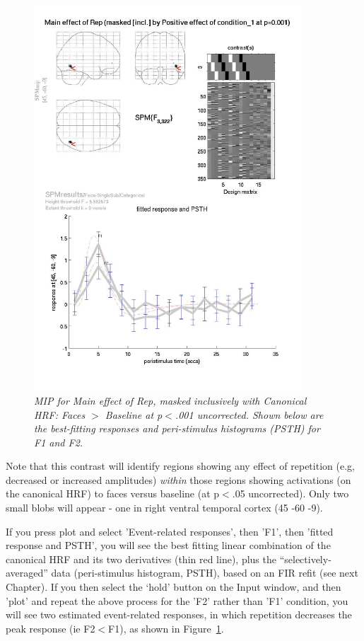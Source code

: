 \begin{figure}
\begin{center}
\includegraphics[width=100mm]{faces/cat3_psth}
\caption{\em MIP for Main effect of Rep, masked inclusively with Canonical HRF: Faces  $>$ Baseline at p$<$.001 uncorrected. Shown below are the best-fitting responses and peri-stimulus histograms (PSTH) for F1 and F2. \label{cat3_psth} } 
\end{center}
\end{figure}

Note that this contrast will identify regions showing any effect of repetition (e.g, decreased or increased amplitudes) {\em within} those regions showing activations (on the canonical HRF) to faces versus baseline (at p$<$.05 uncorrected). Only two small blobs will appear - one in right ventral temporal cortex (45 -60 -9).

If you press plot and select 'Event-related responses', then 'F1', then 'fitted response and PSTH', you will see the best fitting linear combination of the canonical HRF and its two derivatives (thin red line), plus the ``selectively-averaged'' data (peri-stimulus histogram, PSTH), based on an FIR refit (see next Chapter). 
If you then select the `hold' button on the Input window, and then 'plot' and repeat the above process for the 'F2' rather than 'F1' condition, you will see two estimated event-related responses, in which repetition decreases the peak response (ie F2$<$F1), as shown in Figure~\ref{cat3_psth}.


